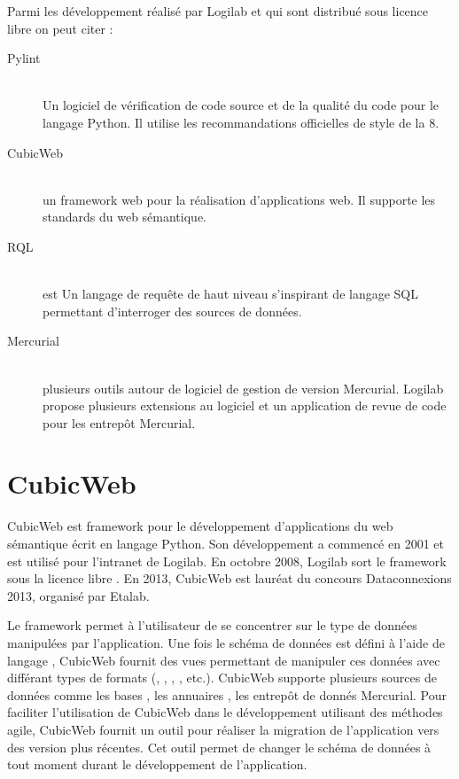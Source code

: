 Parmi les développement réalisé par Logilab et qui sont distribué sous licence libre on peut citer :
\begin{description}
\item[Pylint]\hfill\\ Un logiciel de vérification de code source et de la qualité du code pour le langage Python. Il utilise les recommandations officielles de style de la  8.
\item[CubicWeb]\hfill\\ un framework web pour la réalisation d’applications web. Il supporte les standards du web sémantique.
\item[RQL]\hfill\\  est Un langage de requête de haut niveau s’inspirant de langage SQL permettant d'interroger des sources de données.
\item[Mercurial] \hfill\\ plusieurs outils autour de logiciel de gestion de version Mercurial. Logilab propose plusieurs extensions au logiciel et un application de revue de code pour les entrepôt Mercurial. 
\end{description}



\section{CubicWeb}
CubicWeb est framework pour le développement d'applications du web sémantique écrit en langage Python. Son développement a commencé en 2001 et est utilisé pour l'intranet de Logilab. En octobre 2008, Logilab sort le framework sous la licence libre . En 2013, CubicWeb est lauréat du concours Dataconnexions 2013, organisé par Etalab\cite{etalab}.

Le framework permet à l'utilisateur de se concentrer sur le type de données manipulées par l'application. Une fois le schéma de données est défini à l'aide de langage , CubicWeb fournit des vues permettant de manipuler ces données avec différant types de formats (, , , , etc.). CubicWeb supporte plusieurs sources de données comme les bases , les annuaires , les entrepôt de donnés Mercurial. Pour faciliter l'utilisation de CubicWeb dans le développement utilisant des méthodes agile, CubicWeb fournit un outil pour réaliser la migration de l'application vers des version plus récentes. Cet outil permet de changer le schéma de données à tout moment durant le développement de l'application.


